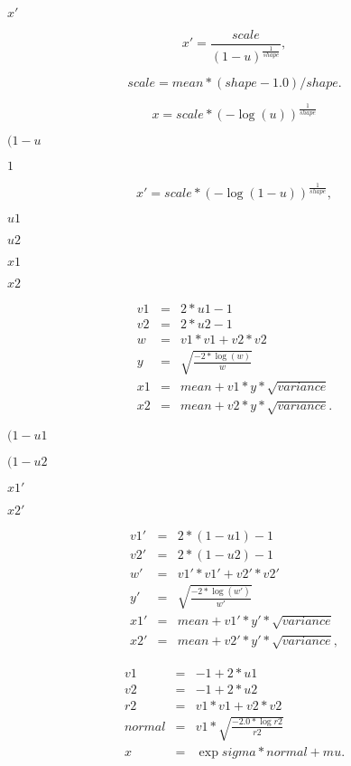 \documentclass{article}
\begin{document}
$x'$
\pagebreak

\[ x' = \frac{scale}{{(1 - u)}^{\frac{1}{shape}}} , \]
\pagebreak

\[ scale = mean * (shape - 1.0) / shape . \]
\pagebreak

\[ x = scale * {(-\log(u))}^{\frac{1}{shape}} \]
\pagebreak

$(1 - u$
\pagebreak

$1$
\pagebreak

\[ x' = scale * {(-\log(1 - u))}^{\frac{1}{shape}} , \]
\pagebreak

$u1$
\pagebreak

$u2$
\pagebreak

$x1$
\pagebreak

$x2$
\pagebreak

\begin{eqnarray*} v1 & = & 2 * u1 - 1 \\ v2 & = & 2 * u2 - 1 \\ w & = & v1 * v1 + v2 * v2 \\ y & = & \sqrt{\frac{-2 * \log(w)}{w}} \\ x1 & = & mean + v1 * y * \sqrt{variance} \\ x2 & = & mean + v2 * y * \sqrt{variance} . \end{eqnarray*}
\pagebreak

$(1 - u1$
\pagebreak

$(1 - u2$
\pagebreak

$x1'$
\pagebreak

$x2'$
\pagebreak

\begin{eqnarray*} v1' & = & 2 * (1 - u1) - 1 \\ v2' & = & 2 * (1 - u2) - 1 \\ w' & = & v1' * v1' + v2' * v2' \\ y' & = & \sqrt{\frac{-2 * \log(w')}{w'}} \\ x1' & = & mean + v1' * y' * \sqrt{variance} \\ x2' & = & mean + v2' * y' * \sqrt{variance} , \end{eqnarray*}
\pagebreak

\begin{eqnarray*} v1 & = & -1 + 2 * u1 \\ v2 & = & -1 + 2 * u2 \\ r2 & = & v1 * v1 + v2 * v2 \\ normal & = & v1 * \sqrt{\frac{-2.0 * \log{r2}}{r2}} \\ x & = & \exp{sigma * normal + mu} . \end{eqnarray*}
\pagebreak
\end{document}
